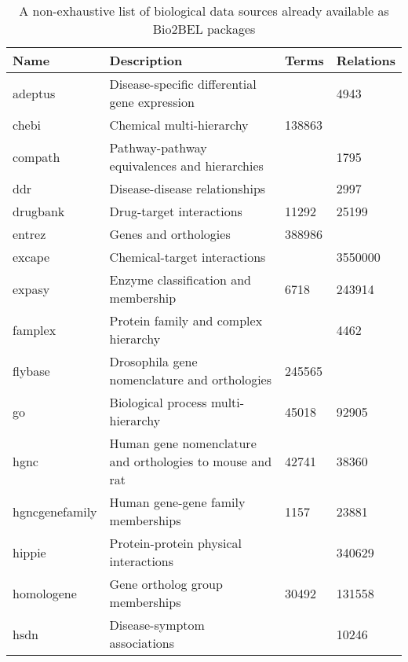 \begin{table}[h!]
\caption{A non-exhaustive list of biological data sources already available as Bio2BEL packages}
\label{tab:summary}
\begin{tabular}{llll}
    \hline
    Name           & Description                                                & Terms  & Relations \\
    \hline
    adeptus        & Disease-specific differential gene expression              &        & 4943      \\
    chebi          & Chemical multi-hierarchy                                   & 138863 &           \\
    compath        & Pathway-pathway equivalences and hierarchies               &        & 1795      \\
    ddr            & Disease-disease relationships                              &        & 2997      \\
    drugbank       & Drug-target interactions                                   & 11292  & 25199     \\
    entrez         & Genes and orthologies                                      & 388986 &           \\
    excape         & Chemical-target interactions                               &        & 3550000   \\
    expasy         & Enzyme classification and membership                       & 6718   & 243914    \\
    famplex        & Protein family and complex hierarchy                       &        & 4462      \\
    flybase        & Drosophila gene nomenclature and orthologies               & 245565 &           \\
    go             & Biological process multi-hierarchy                         & 45018  & 92905     \\
    hgnc           & Human gene nomenclature and orthologies to mouse and rat   & 42741  & 38360     \\
    hgncgenefamily & Human gene-gene family memberships                         & 1157   & 23881     \\
    hippie         & Protein-protein physical interactions                      &        & 340629    \\
    homologene     & Gene ortholog group memberships                            & 30492  & 131558    \\
    hsdn           & Disease-symptom associations                               &        & 10246     \\

\end{tabular}
\end{table}
